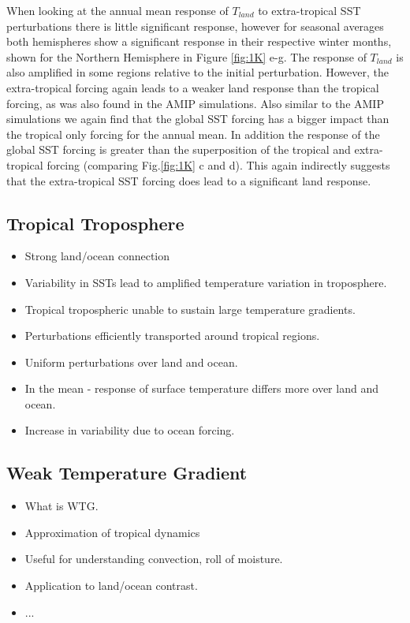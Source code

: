 When looking at the annual mean response of $T_{land}$ to extra-tropical SST 
perturbations there is little significant response, however for seasonal 
averages both hemispheres show a significant response in their respective winter 
months, shown for the Northern Hemisphere in Figure \ref{fig:1K} e-g. The 
response of $T_{land}$ is also amplified in some regions relative to the initial 
perturbation.  However, the extra-tropical forcing again leads to a weaker land 
response than the tropical forcing, as was also found in the AMIP simulations.  
Also similar to the AMIP simulations we again find that the  global SST forcing 
has a bigger impact than the tropical only forcing for the annual mean. In 
addition the response of the global SST forcing is greater than the 
superposition of the tropical and extra-tropical forcing (comparing 
Fig.\ref{fig:1K} c and d).  This again indirectly suggests that the 
extra-tropical SST forcing does lead to a significant land response.

\subsection{Tropical Troposphere}
\begin{itemize}
	\item Strong land/ocean connection
	\item Variability in SSTs lead to amplified temperature variation in 
		troposphere.
	\item Tropical tropospheric unable to sustain large temperature gradients.
	\item Perturbations efficiently transported around tropical regions.
	\item Uniform perturbations over land and ocean.
	\item In the mean - response of surface temperature differs more over land 
		and ocean.
	\item Increase in variability due to ocean forcing.
\end{itemize}

\subsection{Weak Temperature Gradient}
\begin{itemize}
	\item What is WTG.
	\item Approximation of tropical dynamics
	\item Useful for understanding convection, roll of moisture.
	\item Application to land/ocean contrast.
	\item ...
\end{itemize}

